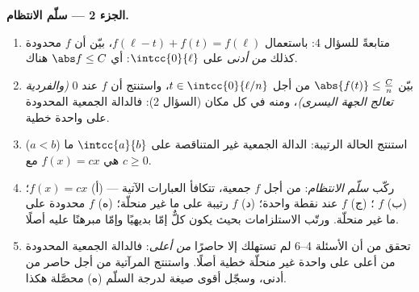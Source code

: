 \begin{problem}[{مسألة نهاية الأسبوع --- $f(x + y) = f(x) + f(y)$:
الانتظام يفرض الخطية، وصورة الوحوش}]
\medskip
\noindent\textbf{الجزء 2 --- سلّم الانتظام.}
\begin{enumerate}[resume]
  \item متابعةً للسؤال 4: باستعمال $f(\ell - t) + f(t) =
        f(\ell)$، بيّن أن $f$ محدودة كذلك \emph{من أدنى} على
        $\intcc{0}{\ell}$: أي $\abs f \leq C$ هناك.
  \item بيّن $\abs{f(t)} \leq \frac{C}{n}$ من أجل $t \in
        \intcc{0}{\ell/n}$، واستنتج أن $f$  عند
        $0$ \emph{(والفردية تعالج الجهة اليسرى)}، ومنه
        في كل مكان (السؤال 2): فالدالة الجمعية المحدودة على
         واحدة خطية.
  \item استنتج الحالة الرتيبة: الدالة الجمعية
        غير المتناقصة على $\intcc{a}{b}$ ما ($a < b$) هي $f(x)
        = cx$ مع $c \geq 0$.
  \item ركّب \emph{سلّم الانتظام}: من أجل $f$
        جمعية، تتكافأ العبارات الآتية --- (أ) $f(x) = cx$؛
        (ب) $f$ ؛ (ج) $f$  عند نقطة واحدة؛ (د)
        $f$ رتيبة على  ما غير منحلّة؛ (ه) $f$
        محدودة على  ما غير منحلّة. ورتّب
        الاستلزامات بحيث يكون كلٌّ إمّا بديهيًا وإمّا مبرهنًا
        عليه أصلًا.
  \item تحقق من أن الأسئلة 4--6 لم تستهلك إلا حاصرًا
        \emph{من أعلى}: فالدالة الجمعية المحدودة من أعلى على 
        واحدة غير منحلّة خطية أصلًا. واستنتج
         المرآتية من أجل حاصر من أدنى، وسجّل
        أقوى صيغة لدرجة السلّم (ه) محصَّلة هكذا.
\end{enumerate}


\end{problem}
